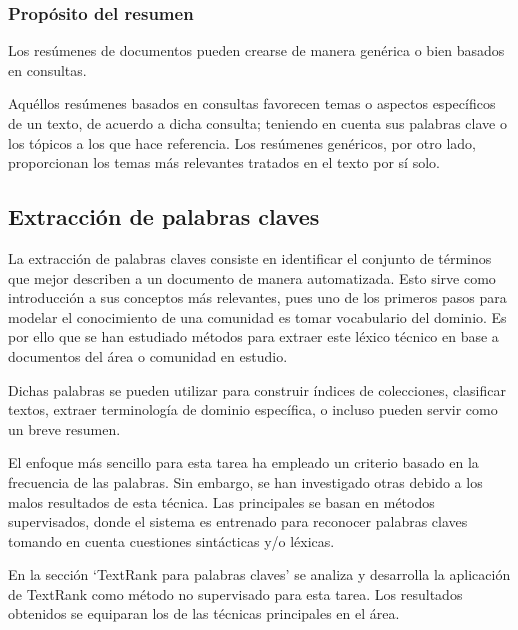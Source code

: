 \documentclass[a4paper]{article}
\begin{document}
\subsubsection{Propósito del resumen}
Los resúmenes de documentos pueden crearse de manera genérica o bien basados en consultas. 

Aquéllos resúmenes basados en consultas favorecen temas o aspectos específicos de un texto, de acuerdo a dicha consulta; teniendo en cuenta sus palabras clave o los tópicos a los que hace referencia. Los resúmenes genéricos, por otro lado, proporcionan los temas más relevantes tratados en el texto por sí solo.


\subsection{Extracción de palabras claves}
La extracción de palabras claves consiste en identificar el conjunto de términos que mejor describen a un documento de manera automatizada. Esto sirve como introducción a sus conceptos más relevantes, pues uno de los primeros pasos para modelar el conocimiento de una comunidad es tomar vocabulario del dominio. Es por ello que se han estudiado métodos para extraer este léxico técnico en base a documentos del área o comunidad en estudio.

Dichas palabras se pueden utilizar para construir índices de colecciones, clasificar textos, extraer terminología de dominio específica, o incluso pueden servir como un breve resumen.

El enfoque más sencillo para esta tarea ha empleado un criterio basado en la frecuencia de las palabras. Sin embargo, se han investigado otras debido a los malos resultados de esta técnica. Las principales se basan en métodos supervisados, donde el sistema es entrenado para reconocer palabras claves tomando en cuenta cuestiones sintácticas y/o léxicas. 

En la sección ‘TextRank para palabras claves’ se analiza y desarrolla la aplicación de TextRank como método no supervisado para esta tarea. Los resultados obtenidos se equiparan los de las técnicas principales en el área.
\end{document}

